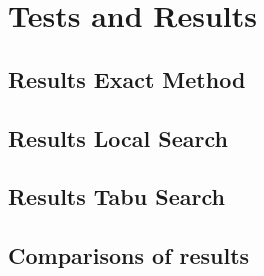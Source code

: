 \section{Tests and Results}

\subsection{Results Exact Method}

\subsection{Results Local Search}

\subsection{Results Tabu Search}

\subsection{Comparisons of results}